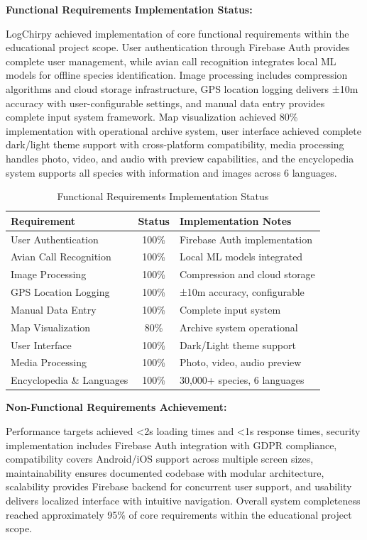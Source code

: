 \textbf{Functional Requirements Implementation Status:}

LogChirpy achieved implementation of core functional requirements within the educational project scope. User authentication through Firebase Auth provides complete user management, while avian call recognition integrates local ML models for offline species identification. Image processing includes compression algorithms and cloud storage infrastructure, GPS location logging delivers ±10m accuracy with user-configurable settings, and manual data entry provides complete input system framework. Map visualization achieved 80\% implementation with operational archive system, user interface achieved complete dark/light theme support with cross-platform compatibility, media processing handles photo, video, and audio with preview capabilities, and the encyclopedia system supports all species with information and images across 6 languages.

\begin{table}[H]
\centering
\begin{tabular}{|l|c|l|}
\hline
\textbf{Requirement} & \textbf{Status} & \textbf{Implementation Notes} \\
\hline
User Authentication & 100\% & Firebase Auth implementation \\
Avian Call Recognition & 100\% & Local ML models integrated \\
Image Processing & 100\% & Compression and cloud storage \\
GPS Location Logging & 100\% & ±10m accuracy, configurable \\
Manual Data Entry & 100\% & Complete input system \\
Map Visualization & 80\% & Archive system operational \\
User Interface & 100\% & Dark/Light theme support \\
Media Processing & 100\% & Photo, video, audio preview \\
Encyclopedia \& Languages & 100\% & 30,000+ species, 6 languages \\
\hline
\end{tabular}
\caption{Functional Requirements Implementation Status}
\label{tab:functional_requirements}
\end{table}

\textbf{Non-Functional Requirements Achievement:}

Performance targets achieved <2s loading times and <1s response times, security implementation includes Firebase Auth integration with GDPR compliance, compatibility covers Android/iOS support across multiple screen sizes, maintainability ensures documented codebase with modular architecture, scalability provides Firebase backend for concurrent user support, and usability delivers localized interface with intuitive navigation. Overall system completeness reached approximately 95\% of core requirements within the educational project scope.

